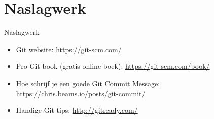 \documentclass[]{beamer}
\begin{document}
\section*{Naslagwerk}

\begin{frame}{Naslagwerk}
    \begin{itemize}
    \item Git website: \url{https://git-scm.com/}
    \item Pro Git book (gratis online boek): \url{https://git-scm.com/book/}
    \item Hoe schrijf je een goede Git Commit Message: \url{https://chris.beams.io/posts/git-commit/}
    \item Handige Git tips: \url{http://gitready.com/}
    \end{itemize}
\end{frame}
\end{document}
